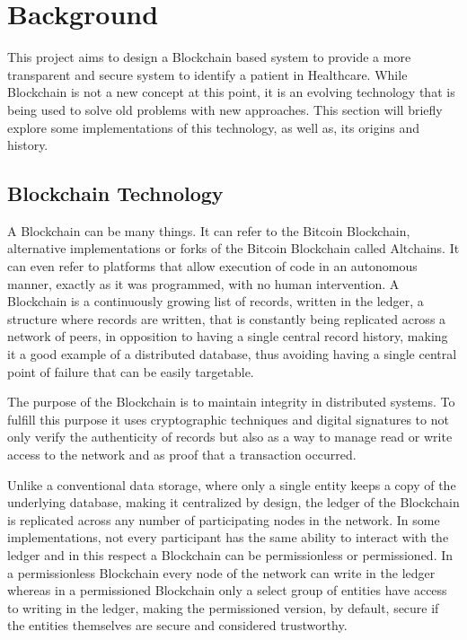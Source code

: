 \chapter{Background}\label{background}

This project aims to design a Blockchain based system to provide a more
transparent and secure system to identify a patient in Healthcare. While
Blockchain is not a new concept at this point, it is an evolving technology
that is being used to solve old problems with new approaches. This section will
briefly explore some implementations of this technology, as well as, its
origins and history.

\section{Blockchain Technology}

  A Blockchain can be many things. It can refer to the Bitcoin Blockchain,
  alternative implementations or forks of the Bitcoin Blockchain called
  Altchains. \cite{Lewis2015} It can even refer to platforms that allow
  execution of code in an autonomous manner, exactly as it was programmed, with
  no human intervention.  A Blockchain is a continuously growing list of
  records, written in the ledger, a structure where records are written, that
  is constantly being replicated across a network of peers, in opposition to
  having a single central record history, making it a good example of a
  distributed database, thus avoiding having a single central point of failure
  that can be easily targetable. \cite{Barclay2017}

  The purpose of the Blockchain is to maintain integrity in distributed
  systems. \cite{Drescher2017} To fulfill this purpose it uses cryptographic
  techniques and digital signatures to not only verify the authenticity of
  records but also as a way to manage read or write access to the network and
  as proof that a transaction occurred.

  Unlike a conventional data storage, where only a single entity keeps a copy
  of the underlying database, making it centralized by design, the ledger of
  the Blockchain is replicated across any number of participating nodes in the
  network.\cite{Lewis2015} In some implementations, not every participant has
  the same ability to interact with the ledger and in this respect a Blockchain
  can be permissionless or permissioned. In a permissionless Blockchain every
  node of the network can write in the ledger whereas in a permissioned
  Blockchain only a select group of entities have access to writing in the
  ledger, making the permissioned version, by default, secure if the entities
  themselves are secure and considered trustworthy.
  \cite{Lewis2015,Valenta2017}

